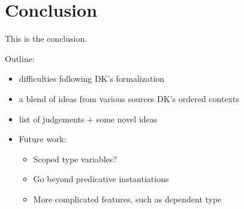 \section{Conclusion}

This is the conclusion.


Outline:
\begin{itemize}
    \item difficulties following DK's formalization
    \item a blend of ideas from various sources DK's ordered contexts
    \item list of judgements + some novel ideas
    \item Future work:
    \begin{itemize}
        \item Scoped type variables?
        \item Go beyond predicative instantiations
        \item More complicated features, such as dependent type
    \end{itemize}
\end{itemize}


